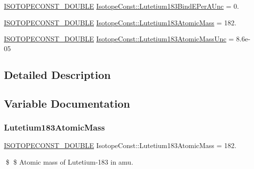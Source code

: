 \begin{DoxyCompactItemize}
\mbox{\hyperlink{group___isotope_const-_macros_ga8f45a7272ce02c0b4c65c44636ed719a}{I\+S\+O\+T\+O\+P\+E\+C\+O\+N\+S\+T\+\_\+\+D\+O\+U\+B\+LE}} \mbox{\hyperlink{group___isotope_const-_lutetium-_lu183_ga633083f464e05794418d796a3f363f68}{Isotope\+Const\+::\+Lutetium183\+Bind\+E\+Per\+A\+Unc}} = 0.
\item 
\mbox{\hyperlink{group___isotope_const-_macros_ga8f45a7272ce02c0b4c65c44636ed719a}{I\+S\+O\+T\+O\+P\+E\+C\+O\+N\+S\+T\+\_\+\+D\+O\+U\+B\+LE}} \mbox{\hyperlink{group___isotope_const-_lutetium-_lu183_ga64bd9f23ced53ba9f8198d74455986de}{Isotope\+Const\+::\+Lutetium183\+Atomic\+Mass}} = 182.
\item 
\mbox{\hyperlink{group___isotope_const-_macros_ga8f45a7272ce02c0b4c65c44636ed719a}{I\+S\+O\+T\+O\+P\+E\+C\+O\+N\+S\+T\+\_\+\+D\+O\+U\+B\+LE}} \mbox{\hyperlink{group___isotope_const-_lutetium-_lu183_ga5af9d5baeb57f25bdd18161d52ab1c93}{Isotope\+Const\+::\+Lutetium183\+Atomic\+Mass\+Unc}} = 8.\+6e-\/05
\end{DoxyCompactItemize}


\subsection{Detailed Description}


\subsection{Variable Documentation}
\mbox{\label{group___isotope_const-_lutetium-_lu183_ga64bd9f23ced53ba9f8198d74455986de}} 
\subsubsection{\texorpdfstring{Lutetium183\+Atomic\+Mass}{Lutetium183AtomicMass}}
{\footnotesize\ttfamily \mbox{\hyperlink{group___isotope_const-_macros_ga8f45a7272ce02c0b4c65c44636ed719a}{I\+S\+O\+T\+O\+P\+E\+C\+O\+N\+S\+T\+\_\+\+D\+O\+U\+B\+LE}} Isotope\+Const\+::\+Lutetium183\+Atomic\+Mass = 182.}

\$ \$ Atomic mass of Lutetium-\/183 in amu. \mbox{\label{group___isotope_const-_lutetium-_lu183_ga5af9d5baeb57f25bdd18161d52ab1c93}} 
